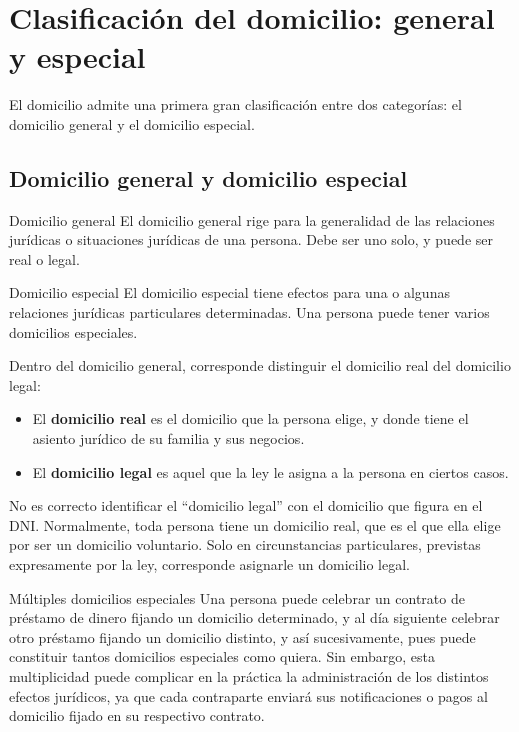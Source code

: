 \documentclass[12pt,oneside]{book}
\begin{document}
\chapter{Clasificación del domicilio: general y especial}

El domicilio admite una primera gran clasificación entre dos categorías: el domicilio general y el domicilio especial.

\section{Domicilio general y domicilio especial}

\begin{definition}{Domicilio general}
El domicilio general rige para la generalidad de las relaciones jurídicas o situaciones jurídicas de una persona. Debe ser uno solo, y puede ser real o legal.
\end{definition}

\begin{definition}{Domicilio especial}
El domicilio especial tiene efectos para una o algunas relaciones jurídicas particulares determinadas. Una persona puede tener varios domicilios especiales.
\end{definition}

Dentro del domicilio general, corresponde distinguir el domicilio real del domicilio legal:

\begin{itemize}
    \item El \textbf{domicilio real} es el domicilio que la persona elige, y donde tiene el asiento jurídico de su familia y sus negocios.
    \item El \textbf{domicilio legal} es aquel que la ley le asigna a la persona en ciertos casos.
\end{itemize}

\begin{important}
No es correcto identificar el ``domicilio legal'' con el domicilio que figura en el DNI. Normalmente, toda persona tiene un domicilio real, que es el que ella elige por ser un domicilio voluntario. Solo en circunstancias particulares, previstas expresamente por la ley, corresponde asignarle un domicilio legal.
\end{important}

\begin{example}{Múltiples domicilios especiales}
Una persona puede celebrar un contrato de préstamo de dinero fijando un domicilio determinado, y al día siguiente celebrar otro préstamo fijando un domicilio distinto, y así sucesivamente, pues puede constituir tantos domicilios especiales como quiera. Sin embargo, esta multiplicidad puede complicar en la práctica la administración de los distintos efectos jurídicos, ya que cada contraparte enviará sus notificaciones o pagos al domicilio fijado en su respectivo contrato.
\end{example}
\end{document}
